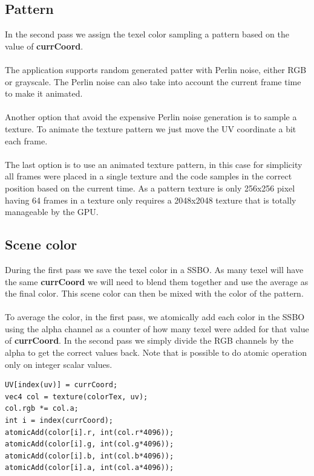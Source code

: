 \documentclass[12pt, a4paper]{article}
\begin{document}
\subsection{Pattern}
In the second pass we assign the texel color sampling a pattern based on the value of \textbf{currCoord}.\\\\
The application supports random generated patter with Perlin noise, either RGB or grayscale. The Perlin noise
can also take into account the current frame time to make it animated.\\\\
Another option that avoid the expensive Perlin noise generation is to sample a texture. To animate the texture pattern
we just move the UV coordinate a bit each frame.\\\\
The last option is to use an animated texture pattern, in this case for simplicity all frames were placed in a single texture
and the code samples in the correct position based on the current time. As a pattern texture is only 256x256 pixel having
64 frames in a texture only requires a 2048x2048 texture that is totally manageable by the GPU.

\subsection{Scene color}
During the first pass we save the texel color in a SSBO. As many texel will have the same \textbf{currCoord} we will
need to blend them together and use the average as the final color. This scene color can then be mixed with the color
of the pattern.\\\\
To average the color, in the first pass, we atomically add each color in the SSBO using the alpha channel as a counter of how many texel
were added for that value of \textbf{currCoord}. In the second pass we simply divide the RGB channels by the alpha to get the correct values back.
Note that is possible to do atomic operation only on integer scalar values.
\begin{lstlisting}[caption={First pass color blending},captionpos=b]
UV[index(uv)] = currCoord;
vec4 col = texture(colorTex, uv);
col.rgb *= col.a;
int i = index(currCoord);
atomicAdd(color[i].r, int(col.r*4096));
atomicAdd(color[i].g, int(col.g*4096));
atomicAdd(color[i].b, int(col.b*4096));
atomicAdd(color[i].a, int(col.a*4096));
\end{lstlisting}
\end{document}
